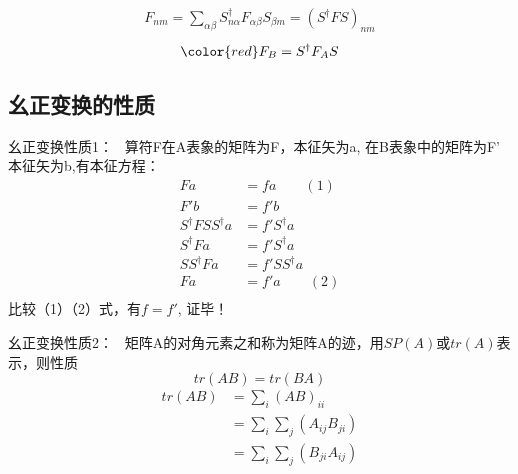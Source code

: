 \begin{frame} 
    \begin{equation*}
    \begin{split}
        F_{nm} = \sum_{\alpha\beta} S_{n\alpha } ^{\dagger} F_{\alpha\beta} S_{\beta m} = (S^{\dagger} F S)_{nm}
    \end{split} 
    \end{equation*} 
    $$\color{red} F_B= S^{\dagger} F_A S $$
\end{frame}

\subsection{幺正变换的性质}

\begin{frame} {幺正变换性质1：}
    \例[19、试证明幺正变换不改变算符的本征值]{} 
    \证~算符F在A表象的矩阵为F，本征矢为a, 在B表象中的矩阵为F' 本征矢为b,有本征方程：
    \begin{equation*}
        \begin{split}
            Fa&=fa \qquad (1)\\
            F'b&=f'b\\
            S^{\dagger} F S S^{\dagger}a &=f'S^{\dagger}a\\
            S^{\dagger} F a &=f'S^{\dagger}a\\
            SS^{\dagger} F a &=f'SS^{\dagger}a\\
            F a &=f'a \qquad (2)\\
        \end{split} 
    \end{equation*} 
    比较（1）（2）式，有$f=f'$, 证毕！
\end{frame}    

\begin{frame} {幺正变换性质2：}
    \例[20、试证明幺正变换不改变矩阵的迹]{}
    \证 ~矩阵A的对角元素之和称为矩阵A的迹，用$SP(A)$或$tr(A)$表示，则性质\\
    $$tr(AB)=tr(BA) $$
    \begin{equation*}
        \begin{split}
            tr(AB) &=\sum_i (AB)_{ii}\\
            &=\sum_{i} \sum_{j} (A_{ij} B_{ji}) \\
            &=\sum_{i} \sum_{j} (B_{ji} A_{ij}) \\
        \end{split} 
    \end{equation*} 
\end{frame}    


